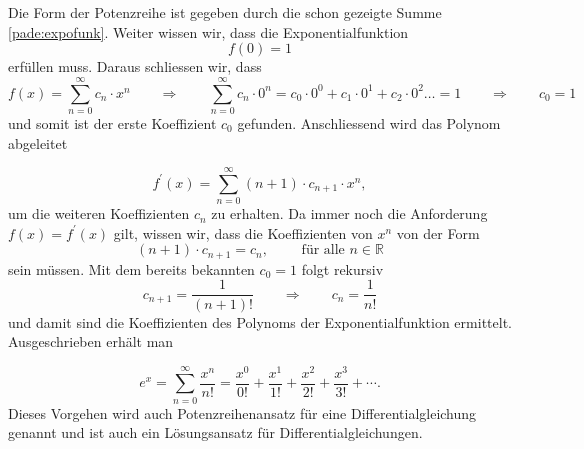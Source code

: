 Die Form der Potenzreihe ist gegeben durch die schon gezeigte Summe \eqref{pade:expofunk}.
Weiter wissen wir, dass die Exponentialfunktion 
\begin{equation*}
f(0) = 1
\end{equation*}
erfüllen muss.
Daraus schliessen wir, dass
\begin{equation*}
f(x)=\sum_{n=0}^{\infty} c_{n} \cdot x^{n}
\qquad\Rightarrow\qquad
\sum_{n=0}^{\infty} c_{n} \cdot 0^{n} 
=
c_{0} \cdot 0^{0} + c_{1} \cdot 0^{1} + c_{2} \cdot 0^{2} \dots = 1
\qquad\Rightarrow\qquad
c_{0} = 1
\end{equation*}
und somit ist der erste Koeffizient $c_0$ gefunden.
Anschliessend wird das Polynom abgeleitet

\begin{equation*}
f^{\prime}(x)
=
\sum_{n=0}^{\infty}(n+1) \cdot c_{n+1} \cdot x^{n},
\end{equation*}
um die weiteren Koeffizienten $c_n$ zu erhalten.
Da immer noch die Anforderung $f(x) = f^{\prime}(x)$ gilt, wissen wir, dass die Koeffizienten von $x^n$  von der Form
\begin{equation*}
(n+1) \cdot c_{n+1} 
= 
c_{n} , \qquad \text{ für alle } n \in \mathbb{R}
\end{equation*}
sein müssen. 
Mit dem bereits bekannten $c_0 = 1$ folgt rekursiv
\begin{equation*}
c_{n+1} 
= 
\frac{1}{(n+1)!}
\qquad\Rightarrow\qquad
c_{n} 
= 
\frac{1}{n!}
\end{equation*}
und damit sind die Koeffizienten des Polynoms der Exponentialfunktion ermittelt.
Ausgeschrieben erhält man


\begin{equation}
e^{x}
=
\sum_{n=0}^{\infty} \frac{x^{n}}{n !}
=
\frac{x^{0}}{0 !}+\frac{x^{1}}{1 !}+\frac{x^{2}}{2 !}+\frac{x^{3}}{3 !}+\cdots .
\label{pade:potenzexp}
\end{equation}
Dieses Vorgehen wird auch Potenzreihenansatz für eine Differentialgleichung genannt und ist auch ein Lösungsansatz für Differentialgleichungen.

